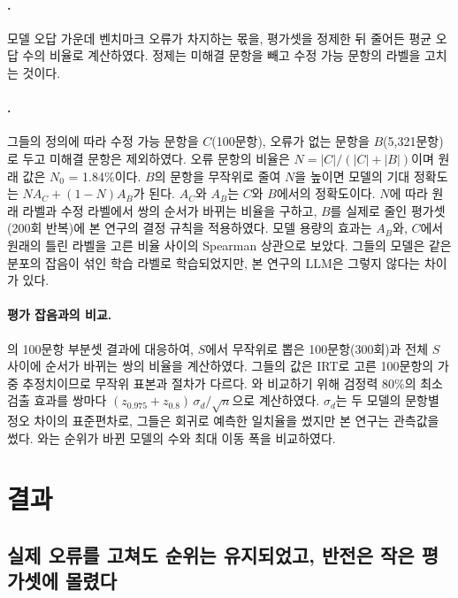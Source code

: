 \documentclass[11pt]{article}
\begin{document}
\paragraph{\citet{vendrow2025platinum}.} 모델 오답 가운데 벤치마크 오류가 차지하는 몫을, 평가셋을 정제한 뒤 줄어든 평균 오답 수의 비율로 계산하였다. 정제는 미해결 문항을 빼고 수정 가능 문항의 라벨을 고치는 것이다.

\paragraph{\citet{northcutt2021pervasive}.} 그들의 정의에 따라 수정 가능 문항을 $C$(100문항), 오류가 없는 문항을 $B$(5,321문항)로 두고 미해결 문항은 제외하였다. 오류 문항의 비율은 $N = |C|/(|C|+|B|)$이며 원래 값은 $N_0$ = 1.84\%이다. $B$의 문항을 무작위로 줄여 $N$을 높이면 모델의 기대 정확도는 $N A_C + (1-N) A_B$가 된다. $A_C$와 $A_B$는 $C$와 $B$에서의 정확도이다. $N$에 따라 원래 라벨과 수정 라벨에서 쌍의 순서가 바뀌는 비율을 구하고, $B$를 실제로 줄인 평가셋(200회 반복)에 본 연구의 결정 규칙을 적용하였다. 모델 용량의 효과는 $A_B$와, $C$에서 원래의 틀린 라벨을 고른 비율 사이의 Spearman 상관으로 보았다. 그들의 모델은 같은 분포의 잡음이 섞인 학습 라벨로 학습되었지만, 본 연구의 LLM은 그렇지 않다는 차이가 있다.

\paragraph{평가 잡음과의 비교.} \citet{madaan2024variance}의 100문항 부분셋 결과에 대응하여, $S$에서 무작위로 뽑은 100문항(300회)과 전체 $S$ 사이에 순서가 바뀌는 쌍의 비율을 계산하였다. 그들의 값은 IRT로 고른 100문항의 가중 추정치이므로 무작위 표본과 절차가 다르다. \citet{card-etal-2020-little}와 비교하기 위해 검정력 80\%의 최소 검출 효과를 쌍마다 $(z_{0.975}+z_{0.8})\,\sigma_d/\sqrt{n}$으로 계산하였다. $\sigma_d$는 두 모델의 문항별 정오 차이의 표준편차로, 그들은 회귀로 예측한 일치율을 썼지만 본 연구는 관측값을 썼다. \citet{alzahrani-etal-2024-benchmarks}와는 순위가 바뀐 모델의 수와 최대 이동 폭을 비교하였다.

\section{결과}

\subsection{실제 오류를 고쳐도 순위는 유지되었고, 반전은 작은 평가셋에 몰렸다}
\label{sec:natural}
\end{document}
